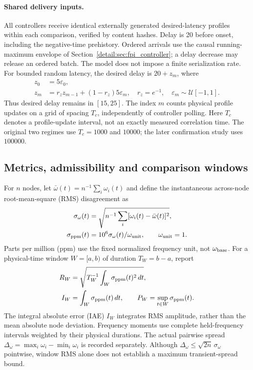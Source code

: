 \paragraph{Shared delivery inputs.}
All controllers receive identical externally generated desired-latency
profiles within each comparison, verified by content hashes. Delay is
20 before onset, including the negative-time prehistory. Ordered arrivals
use the causal running-maximum envelope of
Section~\ref{detail:sec:fpi_controller}; a delay decrease may release an ordered
batch. The model does not impose a finite serialization rate.
For bounded random latency, the desired delay is $20+z_m$, where
\begin{align}
 z_0&=5\varepsilon_0,\nonumber\\
 z_m&=r_z z_{m-1}+(1-r_z)5\varepsilon_m,
 \quad r_z=e^{-1},\quad\varepsilon_m\sim\mathcal U[-1,1].
 \label{detail:eq:eval_random_profile}
\end{align}
Thus desired delay remains in $[15,25]$. The index $m$ counts physical
profile updates on a grid of spacing $T_c$, independently of controller
polling. Here $T_c$ denotes a profile-update interval, not an exactly
measured correlation time. The original two regimes use $T_c=1000$
and $10000$; the later confirmation study uses $100000$.

\subsection{Metrics, admissibility and comparison windows}
\label{detail:subsec:eval_metrics}

For $n$ nodes, let $\bar\omega(t)=n^{-1}\sum_i\omega_i(t)$ and define
the instantaneous across-node root-mean-square (RMS) disagreement as
\begin{align}
 \sigma_\omega(t)&=\sqrt{n^{-1}\sum_i[\omega_i(t)-\bar\omega(t)]^2},\nonumber\\
 \sigma_{\rm ppm}(t)&=10^6\sigma_\omega(t)/\omega_{\rm unit},
 \qquad\omega_{\rm unit}=1.
 \label{detail:eq:eval_disagreement_amplitude}
\end{align}
Parts per million (ppm) use the fixed normalized frequency unit, not
$\omega_{\rm base}$. For a physical-time window $W=[a,b)$ of duration
$T_W=b-a$, report
\begin{align}
 R_W&=\sqrt{T_W^{-1}\int_W\sigma_{\rm ppm}(t)^2\,dt},\nonumber\\
 I_W&=\int_W\sigma_{\rm ppm}(t)\,dt,
 \qquad P_W=\sup_{t\in W}\sigma_{\rm ppm}(t).
 \label{detail:eq:eval_frequency_metrics}
\end{align}
The integral absolute error (IAE) $I_W$ integrates RMS amplitude, rather
than the mean absolute node deviation. Frequency moments use complete
held-frequency intervals weighted by their physical durations.
The actual pairwise spread $\Delta_\omega=\max_i\omega_i-\min_i\omega_i$
is recorded separately. Although
$\Delta_\omega\le\sqrt{2n}\,\sigma_\omega$ pointwise, window RMS alone
does not establish a maximum transient-spread bound.

